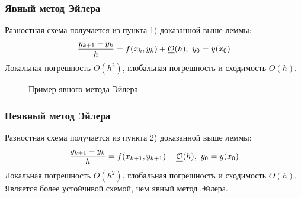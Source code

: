 \subsubsection*{Явный метод Эйлера}

Разностная схема получается из пункта 1) доказанной выше леммы:
\[\frac{y_{k+1}-y_k}{h}= f(x_k,y_k) + \bigO(h),\ y_0=y(x_0)\]
Локальная погрешность $O(h^2)$, глобальная погрешность и сходимость $O(h)$.

\begin{figure}[h]
  \centering
  \caption{Пример явного метода Эйлера}
\end{figure}

\subsubsection*{Неявный метод Эйлера}

Разностная схема получается из пункта 2) доказанной выше леммы:
\[\frac{y_{k+1}-y_k}{h}= f(x_{k+1},y_{k+1}) + \underline{\underline{\mathcal{O}}}(h),\ y_0=y(x_0)\]
Локальная погрешность $O(h^2)$, глобальная погрешность и сходимость $O(h)$.
Является более устойчивой схемой, чем явный метод Эйлера.

